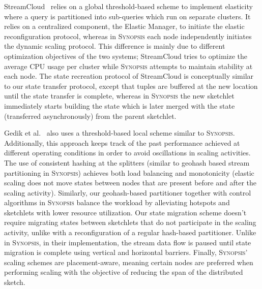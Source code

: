 StreamCloud~\cite{gulisano2012streamcloud} relies on a global threshold-based scheme to implement elasticity where a query is partitioned into sub-queries which run on separate clusters.
It relies on a centralized component, the Elastic Manager, to initiate the elastic reconfiguration protocol, whereas in \textsc{Synopsis} each node independently initiates the dynamic scaling protocol.
This difference is mainly due to different optimization objectives of the two systems; StreamCloud tries to optimize the average CPU usage per cluster while \textsc{Synopsis} attempts to maintain stability at each node.
The state recreation protocol of StreamCloud is conceptually similar to our state transfer protocol, except that tuples are buffered at the new location until the state transfer is complete, whereas in \textsc{Synopsis} the new sketchlet immediately starts building the state which is later merged with the state (transferred asynchronously) from the parent sketchlet.

Gedik et al.~\cite{schneider2009elastic} also uses a threshold-based local scheme similar to \textsc{Synopsis}. Additionally, this approach keeps track of the past performance achieved at different operating conditions in order to avoid oscillations in scaling activities.
The use of consistent hashing at the splitters (similar to geohash based stream partitioning in \textsc{Synopsis}) achieves both load balancing and monotonicity (elastic scaling does not move states between nodes that are present before and after the scaling activity).
Similarly, our geohash-based partitioner together with control algorithms in \textsc{Synopsis} balance the workload by alleviating hotspots and sketchlets with lower resource utilization.
Our state migration scheme doesn't require migrating states between sketchlets that do not participate in the scaling activity, unlike with a reconfiguration of a regular hash-based partitioner.
Unlike in \textsc{Synopsis}, in their implementation, the stream data flow is paused until state migration is complete using vertical and horizontal barriers.
Finally, \textsc{Synopsis}' scaling schemes are placement-aware, meaning certain nodes are preferred when performing scaling with the objective of reducing the span of the distributed sketch.

